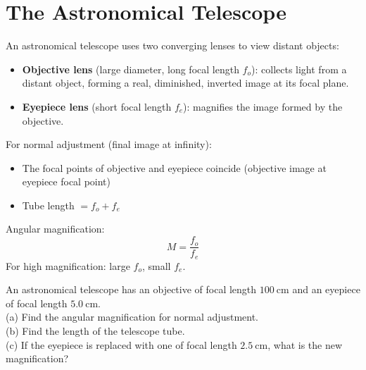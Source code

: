 \begin{diagbox}
\begin{center}
\end{center}
\end{diagbox}

\section{The Astronomical Telescope}

\begin{processbox}
An astronomical telescope uses two converging lenses
to view distant objects:
\begin{itemize}[noitemsep]
  \item \textbf{Objective lens} (large diameter,
  long focal length $f_o$): collects light from a
  distant object, forming a real, diminished,
  inverted image at its focal plane.
  \item \textbf{Eyepiece lens} (short focal length
  $f_e$): magnifies the image formed by the objective.
\end{itemize}

For normal adjustment (final image at infinity):
\begin{itemize}[noitemsep]
  \item The focal points of objective and eyepiece
  coincide (objective image at eyepiece focal point)
  \item Tube length $= f_o + f_e$
\end{itemize}

Angular magnification:
\[
  M = \frac{f_o}{f_e}
\]
For high magnification: large $f_o$, small $f_e$.
\end{processbox}

\begin{examplebox}[20.5]
An astronomical telescope has an objective of focal
length $100\ \text{cm}$ and an eyepiece of focal
length $5.0\ \text{cm}$.\\
(a) Find the angular magnification for normal
adjustment.\\
(b) Find the length of the telescope tube.\\
(c) If the eyepiece is replaced with one of focal
length $2.5\ \text{cm}$, what is the new magnification?
\end{examplebox}

